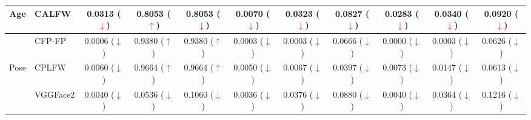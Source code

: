 \documentclass[class=report, crop=false, a4paper, 12pt]{standalone}
\begin{document}
\begin{table}[H]
{\begin{tabular}{cl|ccc|ccc|ccc|}
    \multicolumn{1}{|c|}{\multirow{-2}{*}{Age}}     & CALFW    & \multicolumn{1}{c|}{{\color[HTML]{333333} 0.0313 (\textcolor{red}{$\downarrow$})}} & \multicolumn{1}{c|}{{\color[HTML]{333333} 0.8053 (\textcolor{green}{$\uparrow$})}} & {\color[HTML]{333333} 0.8053 (\textcolor{red}{$\downarrow$})} & \multicolumn{1}{c|}{0.0070 (\textcolor{red}{$\downarrow$})} & \multicolumn{1}{c|}{0.0323 (\textcolor{red}{$\downarrow$})} & 0.0827 (\textcolor{red}{$\downarrow$}) & \multicolumn{1}{c|}{0.0283 (\textcolor{red}{$\downarrow$})} & \multicolumn{1}{c|}{0.0340 (\textcolor{red}{$\downarrow$})} & 0.0920 (\textcolor{red}{$\downarrow$}) \\ \hline
    \multicolumn{1}{|c|}{}                          & CFP-FP   & \multicolumn{1}{c|}{{\color[HTML]{333333} 0.0006 (\textcolor{red}{$\downarrow$})}} & \multicolumn{1}{c|}{{\color[HTML]{333333} 0.9380 (\textcolor{green}{$\uparrow$})}} & {\color[HTML]{333333} 0.9380 (\textcolor{green}{$\uparrow$})} & \multicolumn{1}{c|}{0.0003 (\textcolor{red}{$\downarrow$})} & \multicolumn{1}{c|}{0.0003 (\textcolor{red}{$\downarrow$})} & 0.0666 (\textcolor{red}{$\downarrow$}) & \multicolumn{1}{c|}{0.0000 (\textcolor{red}{$\downarrow$})} & \multicolumn{1}{c|}{0.0003 (\textcolor{red}{$\downarrow$})} & 0.0626 (\textcolor{red}{$\downarrow$}) \\ \cline{2-11} 
    \multicolumn{1}{|c|}{\multirow{-2}{*}{Pose}}    & CPLFW    & \multicolumn{1}{c|}{{\color[HTML]{333333} 0.0060 (\textcolor{red}{$\downarrow$})}} & \multicolumn{1}{c|}{{\color[HTML]{333333} 0.9664 (\textcolor{green}{$\uparrow$})}} & {\color[HTML]{333333} 0.9664 (\textcolor{green}{$\uparrow$})} & \multicolumn{1}{c|}{0.0050 (\textcolor{red}{$\downarrow$})}  & \multicolumn{1}{c|}{0.0067 (\textcolor{red}{$\downarrow$})} & 0.0397 (\textcolor{red}{$\downarrow$}) & \multicolumn{1}{c|}{0.0073 (\textcolor{red}{$\downarrow$})} & \multicolumn{1}{c|}{0.0147 (\textcolor{red}{$\downarrow$})} & 0.0613 (\textcolor{red}{$\downarrow$}) \\ \hline
    \multicolumn{1}{|c|}{}                          & VGGFace2 & \multicolumn{1}{c|}{{\color[HTML]{333333} 0.0040 (\textcolor{red}{$\downarrow$})}} & \multicolumn{1}{c|}{{\color[HTML]{333333} 0.0536 (\textcolor{red}{$\downarrow$})}} & {\color[HTML]{333333} 0.1060 (\textcolor{red}{$\downarrow$})} & \multicolumn{1}{c|}{0.0036 (\textcolor{red}{$\downarrow$})} & \multicolumn{1}{c|}{0.0376 (\textcolor{red}{$\downarrow$})} & 0.0880 (\textcolor{red}{$\downarrow$}) & \multicolumn{1}{c|}{0.0040 (\textcolor{red}{$\downarrow$})} & \multicolumn{1}{c|}{0.0364 (\textcolor{red}{$\downarrow$})} & 0.1216 (\textcolor{red}{$\downarrow$}) \\ \cline{2-11} 

\end{tabular}}
\end{table}
\end{document}
